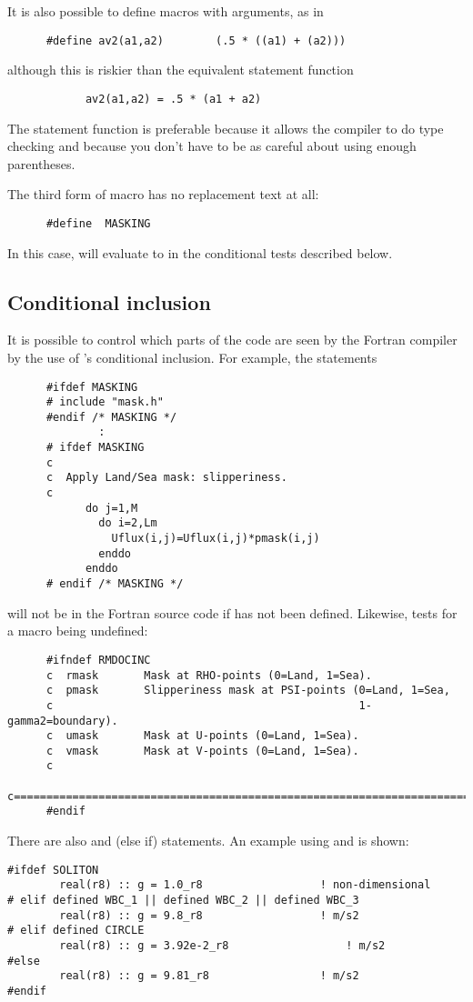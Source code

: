 It is also possible to define macros with arguments, as in
\begin{verbatim}
      #define av2(a1,a2)        (.5 * ((a1) + (a2)))
\end{verbatim}
although this is riskier than the equivalent statement function
\begin{verbatim}
            av2(a1,a2) = .5 * (a1 + a2)
\end{verbatim}
The statement function is preferable because it allows the compiler
to do type checking and because you don't have to be as careful
about using enough parentheses.

The third form of macro has no replacement text at all:
\begin{verbatim}
      #define  MASKING
\end{verbatim}
In this case,  will evaluate to  in the
conditional tests described below.

\subsection{Conditional inclusion}
It is possible to control which parts of the code are seen by the
Fortran compiler by the use of 's conditional inclusion.
For example, the statements
\begin{verbatim}
      #ifdef MASKING
      # include "mask.h"
      #endif /* MASKING */
              :
      # ifdef MASKING
      c
      c  Apply Land/Sea mask: slipperiness.
      c
            do j=1,M
              do i=2,Lm
                Uflux(i,j)=Uflux(i,j)*pmask(i,j)
              enddo
            enddo
      # endif /* MASKING */
\end{verbatim}
will not be in the Fortran source code if  has not
been defined.  Likewise,
 tests for a macro being undefined:
\begin{verbatim}
      #ifndef RMDOCINC
      c  rmask       Mask at RHO-points (0=Land, 1=Sea).
      c  pmask       Slipperiness mask at PSI-points (0=Land, 1=Sea,
      c                                               1-gamma2=boundary).
      c  umask       Mask at U-points (0=Land, 1=Sea).
      c  vmask       Mask at V-points (0=Land, 1=Sea).
      c
      c=======================================================================
      #endif
\end{verbatim}

There are also  and  (else if) statements.
An example using  and  is
shown:
\begin{verbatim}
#ifdef SOLITON
        real(r8) :: g = 1.0_r8                  ! non-dimensional
# elif defined WBC_1 || defined WBC_2 || defined WBC_3
        real(r8) :: g = 9.8_r8                  ! m/s2
# elif defined CIRCLE
        real(r8) :: g = 3.92e-2_r8                  ! m/s2
#else
        real(r8) :: g = 9.81_r8                 ! m/s2
#endif
\end{verbatim}


